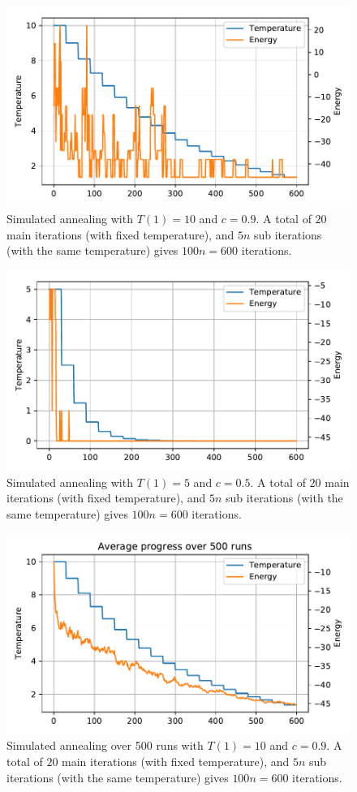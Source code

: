 \documentclass[12pt, a4paper]{article}
\begin{document}
{\begin{figure}[ht!]
\centering
\includegraphics[width=0.7\linewidth]{figs/ch7_computer_ex2_a}
\caption{Simulated annealing with $T(1) = 10$ and $c = 0.9$.
	A total of $20$ main iterations (with fixed temperature), and $5n$ sub iterations (with the same temperature) gives $100 n = 600$ iterations.}
\label{fig:ch7_computer_ex2_a}
\end{figure}

\begin{figure}[ht!]
	\centering
	\includegraphics[width=0.7\linewidth]{figs/ch7_computer_ex2_b}
	\caption{Simulated annealing with $T(1) = 5$ and $c = 0.5$.
		A total of $20$ main iterations (with fixed temperature), and $5n$ sub iterations (with the same temperature) gives $100 n = 600$ iterations.}
	\label{fig:ch7_computer_ex2_b}
\end{figure}

\begin{figure}[ht!]
	\centering
	\includegraphics[width=0.7\linewidth]{figs/ch7_computer_ex2_extra}
	\caption{Simulated annealing over 500 runs with $T(1) = 10$ and $c = 0.9$.
		A total of $20$ main iterations (with fixed temperature), and $5n$ sub iterations (with the same temperature) gives $100 n = 600$ iterations.}
	\label{fig:ch7_computer_ex2_extra}
\end{figure}



}
\end{document}
